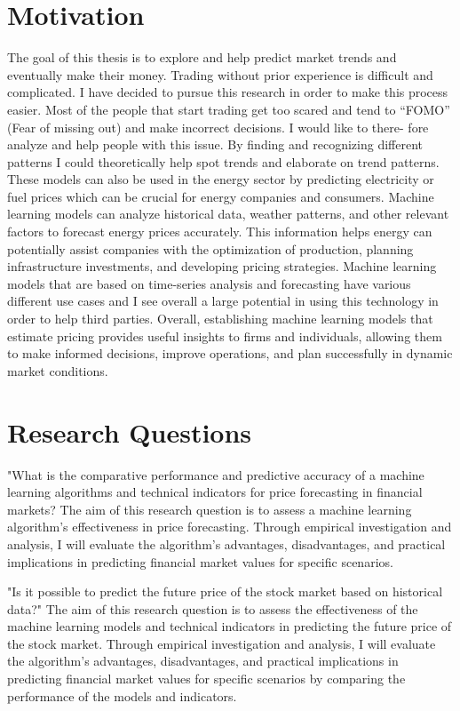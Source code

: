 \documentclass{imc-inf}
\begin{document}
\section{Motivation}
The goal of this thesis is to explore and help predict market trends and
eventually make their money. Trading without prior experience is difficult
and complicated. I have decided to pursue this research in order to make this
process easier. Most of the people that start trading get too scared and tend to
“FOMO” (Fear of missing out) and make incorrect decisions. I would like to there-
fore analyze and help people with this issue. By finding and recognizing different
patterns I could theoretically help spot trends and elaborate on trend patterns.
These models can also be used in the energy sector by predicting electricity or
fuel prices which can be crucial for energy companies and consumers. Machine
learning models can analyze historical data, weather patterns, and other relevant
factors to forecast energy prices accurately. This information helps energy can potentially assist companies with the optimization of production,
planning infrastructure investments, and developing pricing strategies. Machine learning models that
are based on time-series analysis and forecasting have various different use cases
and I see overall a large potential in using this technology in order to help third parties. Overall, establishing machine learning models that estimate pricing provides
useful insights to firms and individuals, allowing them to make informed decisions,
improve operations, and plan successfully in dynamic market conditions.

\section{Research Questions} 

"What is the comparative performance and predictive accuracy of a machine learning
algorithms and technical indicators for price forecasting in financial markets? The aim of this research
question is to assess a machine learning algorithm's effectiveness in price forecasting.
Through empirical investigation and analysis, I will evaluate the algorithm's advantages,
disadvantages, and practical implications in predicting financial market values for specific scenarios.


"Is it possible to predict the future price of the stock market based on historical data?" 
The aim of this research question is to assess the effectiveness of the machine learning models 
and technical indicators in predicting the future price of the stock market.
Through empirical investigation and analysis, I will evaluate the algorithm's advantages,
disadvantages, and practical implications in predicting financial market values for specific scenarios by comparing the performance of the models and indicators.
\end{document}
